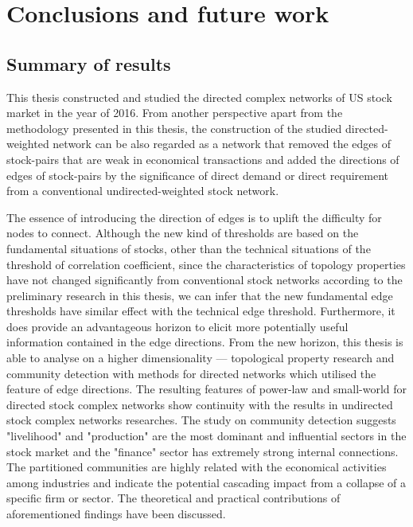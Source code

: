 \chapter[Conclusions]{Conclusions and future work}
\label{cpt:conclude}
\section{Summary of results}
This thesis constructed and studied the directed complex networks of US stock market in the year of 2016. From another perspective apart from the methodology presented in this thesis, the construction of the studied directed-weighted network can be also regarded as a network that removed the edges of stock-pairs that are weak in economical transactions and added the directions of edges of stock-pairs by the significance of direct demand or direct requirement from a conventional undirected-weighted stock network.

The essence of introducing the direction of edges is to uplift the difficulty for nodes to connect. Although the new kind of thresholds are based on the fundamental situations of stocks, other than the technical situations of the threshold of correlation coefficient, since the characteristics of topology properties have not changed significantly from conventional stock networks according to the preliminary research in this thesis, we can infer that the new fundamental edge thresholds have similar effect with the technical edge threshold. Furthermore, it does provide an advantageous horizon to elicit more potentially useful information contained in the edge directions. From the new horizon, this thesis is able to analyse on a higher dimensionality — topological property research and community detection with methods for directed networks which utilised the feature of edge directions. The resulting features of power-law and small-world for directed stock complex networks show continuity with the results in undirected stock complex networks researches. The study on community detection suggests "livelihood" and "production" are the most dominant and influential sectors in the stock market and the "finance" sector has extremely strong internal connections. The partitioned communities are highly related with the economical activities among industries and indicate the potential cascading impact from a collapse of a specific firm or sector. The theoretical and practical contributions of aforementioned findings have been discussed.


